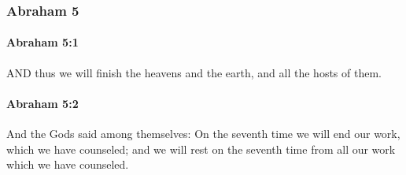 		
	\subsubsection{Abraham 5} %
		\label{ABRAHAM-5}
		
		\paragraph{Abraham 5:1} %
			\label{ABRAHAM-5-1}

			AND thus we will finish the heavens and the earth, and all the hosts of them.


		\paragraph{Abraham 5:2} %
			\label{ABRAHAM-5-2}

			And the Gods said among themselves: On the seventh time we will end our work, which we have counseled; and we will rest on the seventh time from all our work which we have counseled.

